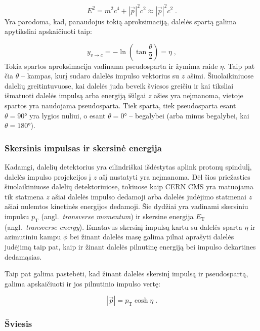 \documentclass[a4paper, 12pt]{article}
\newcommand{\pT}{p_{\mathrm{T}}}
\newcommand{\ET}{E_{\mathrm{T}}}
\newlength\q
\begin{document}
\begin{equation}
	E^2 = m^2c^4 + |\vec{p}|^2c^2 \approx |\vec{p}|^2c^2 \; .
	\label{eq:relEnergy}
\end{equation}
Yra parodoma, kad, panaudojus tokią aproksimaciją, dalelės spartą galima apytiksliai apskaičiuoti taip:

\begin{equation}
	y_{v\rightarrow c} = -\ln \left( \tan \frac{\theta}{2} \right) = \eta \; \mathrm{,}
	\label{eq:pseudorapidity}
\end{equation}
Tokia spartos aproksimacija vadinama pseudosparta ir žymima raide $\eta$.
Taip pat čia $\theta$ -- kampas, kurį sudaro dalelės impulso vektorius su $z$ ašimi.
Šiuolaikiniuose dalelių greitintuvuose, kai dalelės juda beveik šviesos greičiu ir kai tiksliai
išmatuoti dalelės impulsą arba energiją išilgai $z$ ašies yra neįmanoma, vietoje spartos
yra naudojama pseudosparta.
Tiek sparta, tiek pseudosparta esant $\theta=\ang{90}$ yra lygios nuliui, o esant $\theta=\ang{0}$ --
begalybei (arba minus begalybei, kai $\theta=\ang{180}$).


\subsubsection*{Skersinis impulsas ir skersinė energija}

Kadamgi, dalelių detektorius yra cilindriškai išdėstytas aplink protonų spindulį, dalelės impulso
projekcijos į $z$ ašį nustatyti yra neįmanoma.
Dėl šios priežasties šiuolaikiniuose dalelių detektoriuiose, tokiuose kaip CERN CMS yra matuojama tik
statmena $z$ ašiai dalelės impulso dedamoji arba dalelės judėjimo statmenai $z$ ašiai nulemtos kinetinės
energijos
dedamoji.
Šie dydžiai yra vadinami skersiniu impulsu $\pT$ (angl.\ \textit{transverse momentum}) ir
skersine energija $\ET$ (angl.\ \textit{transverse energy}).
Išmatavus skersinį impulsą kartu su dalelės sparta $\eta$ ir azimutiniu kampu $\phi$ bei žinant dalelės
masę galima pilnai aprašyti dalelės judėjimą taip pat, kaip ir žinant dalelės pilnutinę energiją bei
impulso dekartines dedamąsias.

Taip pat galima pastebėti, kad žinant dalelės skersinį impulsą ir pseudospartą, galima apskaičiuoti ir
jos pilnutinio impulso vertę:

\begin{equation}
	|\vec p|=p_{\mathrm{T}}\cosh\eta \; .
	\label{eq:pmodpt}
\end{equation}


\subsubsection*{Šviesis}
\end{document}
